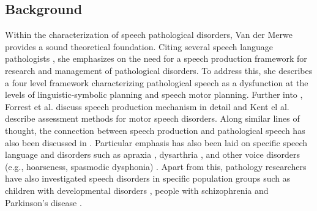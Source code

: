 \documentclass{article}
\begin{document}
\subsection{Background}
Within the characterization of speech pathological disorders, Van der Merwe \cite{mcneil2009clinical} provides a sound theoretical foundation. 
Citing several speech language pathologists \cite{kent1987relative,marquardt1984elusive}, she emphasizes on the need for a speech production framework for research and management of pathological disorders. 
To address this, she describes a four level framework characterizing pathological speech as a dysfunction at the levels of linguistic-symbolic planning and speech motor planning. 
Further into \cite{mcneil2009clinical}, Forrest et al. discuss speech production mechanism in detail and Kent el al. describe assessment methods for motor speech disorders. 
Along similar lines of thought, the connection between speech production and pathological speech has also been discussed in \cite{netsell1991neurobiologic,kent2000research}. 
Particular emphasis has also been laid on specific speech language and disorders such as apraxia \cite{wambaugh2002summary}, dysarthria \cite{yorkston2007evidence}, and other voice disorders (e.g., hoarseness, spasmodic dysphonia) \cite{aronson2011clinical}. 
Apart from this, pathology researchers have also investigated speech disorders in specific population groups such as children with developmental disorders \cite{millar2006impact}, people with schizophrenia \cite{delisi2001speech} and Parkinson's disease \cite{critchley1981speech}.
\end{document}
